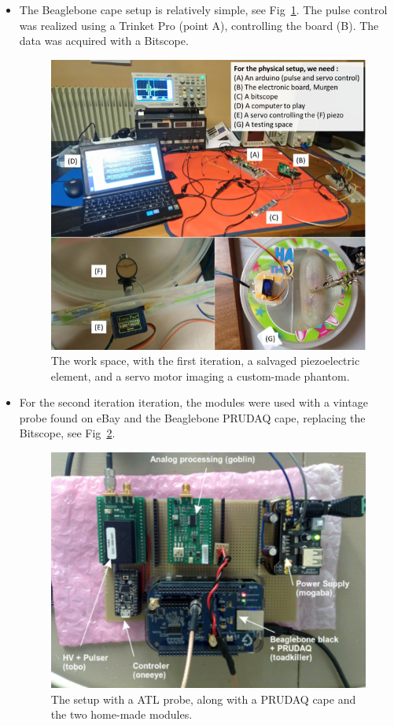 \documentclass[letterpaper, 10 pt, conference]{ieeeconf} %
\begin{document}
\begin{itemize}
\item The Beaglebone cape setup is relatively simple, see Fig~\ref{fig:workspace}. The pulse control was realized using a Trinket Pro (point A), controlling the board (B). The data was acquired with a Bitscope.

\begin{figure}%
\centering
\includegraphics[width=.95\linewidth]{space}
\caption{The work space, with the first iteration, a salvaged piezoelectric element, and a servo motor imaging a custom-made phantom.}
\label{fig:workspace}
\end{figure}

\item For the second iteration iteration, the modules were used with a vintage probe found on eBay and the Beaglebone PRUDAQ cape, replacing the Bitscope, see Fig~\ref{fig:atl}.

\begin{figure}%
\centering
\includegraphics[width=.95\linewidth]{prudaq}
\caption{The setup with a ATL probe, along with a PRUDAQ cape and the two home-made modules.}
\label{fig:atl}
\end{figure}



\end{itemize}
\end{document}

